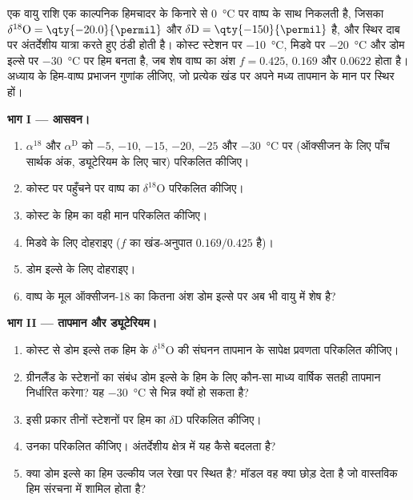 \begin{problem}\label{pb:b3:stable-isotopes:1}
एक वायु राशि एक काल्पनिक हिमचादर के किनारे से \qty{0}{\celsius} पर
वाष्प के साथ निकलती है, जिसका $\delta^{18}\mathrm O = \qty{-20.0}{\permil}$ और $\delta\mathrm D =
\qty{-150}{\permil}$ है, और स्थिर दाब पर अंतर्देशीय यात्रा करते हुए ठंडी होती है।
कोस्ट स्टेशन पर \qty{-10}{\celsius}, मिडवे पर \qty{-20}{\celsius} और डोम इल्से पर
\qty{-30}{\celsius} पर हिम बनता है, जब शेष वाष्प का अंश
$f = 0.425$, $0.169$ और $0.0622$ होता है। अध्याय के हिम-वाष्प प्रभाजन गुणांक लीजिए,
जो प्रत्येक खंड पर
अपने मध्य तापमान के मान पर स्थिर हों।

\medskip\noindent\textbf{भाग I --- आसवन।}
\begin{enumerate}
\item $\alpha^{18}$ और $\alpha^{\mathrm D}$ को $-5$, $-10$, $-15$, $-20$,
$-25$ और \qty{-30}{\celsius} पर (ऑक्सीजन के लिए पाँच सार्थक अंक, ड्यूटेरियम के लिए चार)
परिकलित कीजिए।
\item कोस्ट पर पहुँचने पर वाष्प का $\delta^{18}\mathrm O$ परिकलित कीजिए।
\item कोस्ट के हिम का वही मान परिकलित कीजिए।
\item मिडवे के लिए दोहराइए ($f$ का खंड-अनुपात $0.169/0.425$ है)।
\item डोम इल्से के लिए दोहराइए।
\item वाष्प के मूल ऑक्सीजन-18 का कितना अंश
डोम इल्से पर अब भी वायु में शेष है?
\end{enumerate}

\medskip\noindent\textbf{भाग II --- तापमान और ड्यूटेरियम।}
\begin{enumerate}[resume]
\item कोस्ट से डोम इल्से तक हिम के $\delta^{18}\mathrm O$ की
संघनन तापमान के सापेक्ष प्रवणता परिकलित कीजिए।
\item ग्रीनलैंड के स्टेशनों का संबंध डोम इल्से के हिम के लिए कौन-सा
माध्य वार्षिक सतही तापमान निर्धारित करेगा? यह
\qty{-30}{\celsius} से भिन्न क्यों हो सकता है?
\item इसी प्रकार तीनों स्टेशनों पर हिम का $\delta\mathrm D$ परिकलित कीजिए।
\item उनका  परिकलित कीजिए। अंतर्देशीय क्षेत्र में यह कैसे बदलता है?
\item क्या डोम इल्से का हिम उल्कीय जल रेखा पर स्थित है? मॉडल
वह क्या छोड़ देता है जो वास्तविक हिम संरचना में शामिल होता है?
\end{enumerate}


\end{problem}
